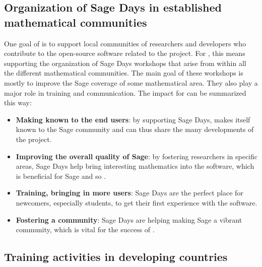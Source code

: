 \documentclass{deliverablereport}
\begin{document}








\subsection{Organization of Sage Days in established mathematical communities}

One goal of \ODK is to support local communities of researchers
and developers who contribute to the open-source software related to
the project. For \Sage, this means supporting the organization of Sage Days
workshops that arise from within all the different mathematical communities. The main 
goal of these workshops is mostly to improve the Sage coverage of some mathematical
area. They also play a major role in training and communication. The
impact for \ODK can be summarized this way:

\begin{itemize}
\item \textbf{Making \ODK known to the end users}: by supporting Sage Days,
\ODK makes itself known to the Sage community and can
thus share the many developments of the project.

\item \textbf{Improving the overall quality of Sage}: by fostering researchers
in specific areas, Sage Days help bring interesting mathematics into
the software, which is beneficial for Sage and so \ODK.

\item \textbf{Training, bringing in more users}: Sage Days are the perfect place
for newcomers, especially students, to get their first experience with the software.

\item \textbf{Fostering a community}: Sage Days are helping making Sage a vibrant
community, which is vital for the success of \ODK.
\end{itemize}



\subsection{Training activities in developing countries}


\end{document}
